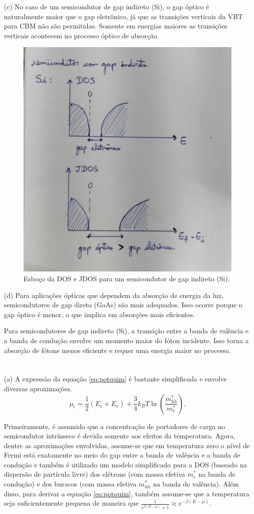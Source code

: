 \documentclass[a4paper,10pt]{article}
\begin{document}
\n

(c) No caso de um semicondutor de gap indireto (Si), o gap óptico é naturalmente maior que o gap eletrônico, já que as transições verticais da VBT para CBM não são permitidas. Somente em energias maiores as transições verticais acontecem no processo óptico de absorção.

\begin{figure}[H]
\centering
\includegraphics[width=0.38\linewidth]{fig/dos-jdos-indireto.jpeg}
\caption{Esboço da DOS e JDOS para um semicondutor de gap indireto (Si).}
\label{fig:dos-jdos-indireto}
\end{figure}

\n

(d) Para aplicações ópticas que dependem da absorção de energia da luz, semicondutores de gap direto (GaAs) são mais adequados. Isso ocorre porque o gap óptico é menor, o que implica em absorções mais eficientes.

Para semicondutores de gap indireto (Si), a transição entre a banda de valência e a banda de condução envolve um momento maior do fóton incidente. Isso torna a absorção de fótons menos eficiente e requer uma energia maior no processo.

\pagebreak

\section{}

(a) A expressão da equação \ref{eq:potquim} é bastante simplificada e envolve diversas aproximações.
\begin{equation} \label{eq:potquim}
\mu_i = \frac{1}{2} (E_c + E_v) + \frac{3}{4} k_B T \ln(\frac{m_{hh}^*}{m_c^*}).
\end{equation}

Primeiramente, é assumido que a concentração de portadores de carga no semicondutor intrínseco é devida somente aos efeitos da temperatura. Agora, dentre as aproximações envolvidas, assume-se que em temperatura zero o nível de Fermi está exatamente no meio do gap entre a banda de valência e a banda de condução e também é utilizado um modelo simplificado para a DOS (baseado na dispersão de partícula livre) dos elétrons (com massa efetiva $m_c^*$ na banda de condução) e dos buracos (com massa efetiva $m_{hh}^*$ na banda de valência). Além disso, para derivar a equação \ref{eq:potquim}, também assume-se que a temperatura seja suficientemente pequena de maneira que $\displaystyle{\frac{1}{e^{\beta(E-\mu)} + 1} \approx e^{-\beta(E-\mu)}}$.
\end{document}
